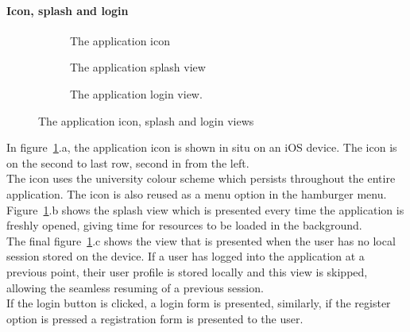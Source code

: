 \documentclass[preprint,12pt,3p]{elsarticle}
\begin{document}
\paragraph{Icon, splash and login}
\begin{figure}[H]
    \centering
    \begin{subfigure}[t]{0.32\columnwidth}
        \centering
        \caption{The application icon}
    \end{subfigure}
    \begin{subfigure}[t]{0.32\columnwidth}
        \centering
        \caption{The application splash view}
    \end{subfigure}
    \begin{subfigure}[t]{0.32\columnwidth}
        \centering
        \caption{The application login view.}
    \end{subfigure}
    \caption{The application icon, splash and login views}
    \label{fig:iconsplashlogin}
\end{figure}
In figure~\ref{fig:iconsplashlogin}.a, the application icon is shown in situ on an iOS device. The icon is on the second to last row, second in from the left.\\
The icon uses the university colour scheme which persists throughout the entire application. The icon is also reused as a menu option in the hamburger menu.\\
Figure~\ref{fig:iconsplashlogin}.b shows the splash view which is presented every time the application is freshly opened, giving time for resources to be loaded in the background.\\
The final figure~\ref{fig:iconsplashlogin}.c shows the view that is presented when the user has no local session stored on the device. If a user has logged into the application at a previous point, their user profile is stored locally and this view is skipped, allowing the seamless resuming of a previous session.\\
If the login button is clicked, a login form is presented, similarly, if the register option is pressed a registration form is presented to the user.
\end{document}
